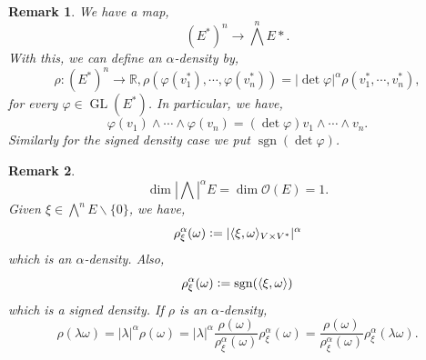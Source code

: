 \documentclass[10pt]{article}
\newtheorem{remark}{Remark}[section]
\DeclareMathOperator{\GL}{GL}
\DeclareMathOperator{\sgn}{sgn}
\newcommand{\defeq}{\vcentcolon=}
\newcommand{\R}[0]{\mathbb{R}}
\begin{document}
\begin{remark}
  We have a map,
\begin{equation*}
  (E^*)^n\to\bigwedge^n E*.
\end{equation*}
With this, we can define an $\alpha$-density by,
\begin{equation*}
  \rho:(E^*)^n\to\R, \rho(\varphi(v_1^*),\cdots,\varphi(v_n^*)) = \vert\det\varphi\vert^\alpha\rho(v_1^*,\cdots,v_n^*),
\end{equation*}
for every $\varphi\in\GL(E^*)$. In particular, we have,
\begin{equation*}
  \varphi(v_1)\wedge\cdots\wedge\varphi(v_n) = (\det\varphi) v_1\wedge\cdots\wedge v_n.
\end{equation*}
Similarly for the signed density case we put $\sgn(\det\varphi)$.
\end{remark}

\begin{remark}
  \begin{equation*}
    \dim\left\vert\bigwedge\right\vert^\alpha E = \dim \mathcal{O}(E) = 1.
  \end{equation*}
  Given $\xi\in\bigwedge^nE\backslash\{0\}$, we have,
  \begin{equation*}
    \rho_\xi^\alpha(\omega) \defeq \vert\langle\xi,\omega\rangle_{V\times V^*}\vert^\alpha
  \end{equation*}
  which is an $\alpha$-density. Also,
  \begin{equation*}
    \rho_\xi^\alpha(\omega)\defeq \sgn(\langle\xi,\omega\rangle)
  \end{equation*}
  which is a signed density. If $\rho$ is an $\alpha$-density,
  \begin{equation*}
    \rho(\lambda\omega) = \vert\lambda\vert^\alpha\rho(\omega) = \vert\lambda\vert^\alpha{\frac {\rho(\omega)} {\rho^\alpha_\xi(\omega)}}\rho^\alpha_\xi(\omega) = {\frac {\rho(\omega)} {\rho_\xi^\alpha(\omega)}}\rho_\xi^\alpha(\lambda\omega).
  \end{equation*}
\end{remark}
\end{document}
